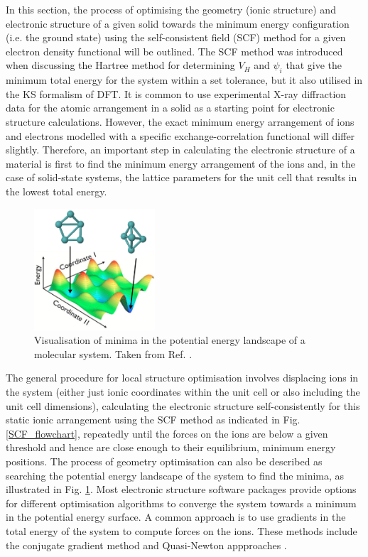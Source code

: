 \documentclass[11pt, twoside]{report}
\begin{document}
In this section, the process of optimising the geometry (ionic structure) and electronic structure of a given solid towards the minimum energy configuration (i.e. the ground state) using the self-consistent field (SCF) method for a given electron density functional will be outlined. The SCF method was introduced when discussing the Hartree method for determining $V_H$ and $\psi_i$ that give the minimum total energy for the system within a set tolerance, but it also utilised in the KS formalism of DFT. It is common to use experimental X-ray diffraction data for the atomic arrangement in a solid as a starting point for electronic structure calculations. However, the exact minimum energy arrangement of ions and electrons modelled with a specific exchange-correlation functional will differ slightly. Therefore, an important step in calculating the electronic structure of a material is first to find the minimum energy arrangement of the ions and, in the case of solid-state systems, the lattice parameters for the unit cell that results in the lowest total energy.
\begin{figure}[h!]
  \centering
    \includegraphics[width=0.4\textwidth]{figures/PE_landscape}
    \caption{Visualisation of minima in the potential energy landscape of a molecular system. Taken from Ref. .}
  \label{PE_landscape}
\end{figure}

The general procedure for local structure optimisation involves displacing ions in the system (either just ionic coordinates within the unit cell or also including the unit cell dimensions), calculating the electronic structure self-consistently for this static ionic arrangement using the SCF method as indicated in Fig. \ref{SCF_flowchart}, repeatedly until the forces on the ions are below a given threshold and hence are close enough to their equilibrium, minimum energy positions. The process of geometry optimisation can also be described as searching the potential energy landscape of the system to find the minima, as illustrated in Fig. \ref{PE_landscape}. Most electronic structure software packages provide options for different optimisation algorithms to converge the system towards a minimum in the potential energy surface. A common approach is to use gradients in the total energy of the system to compute forces on the ions. These methods include the conjugate gradient method and Quasi-Newton appproaches \cite{FHI-aims_slides_Lange}.
\end{document}
